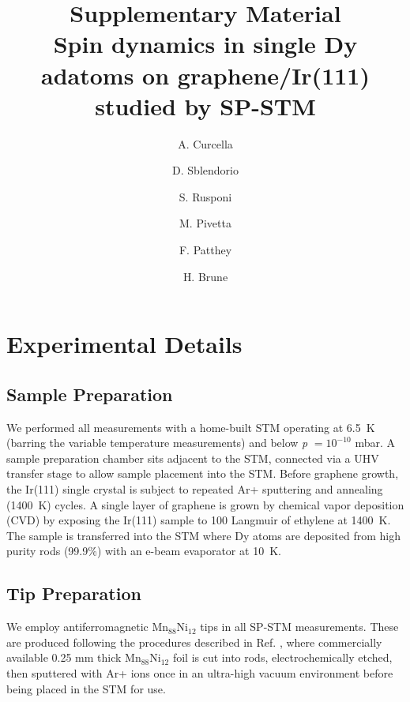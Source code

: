 \documentclass[reprint,amsmath,amssymb,aps,nofootinbib,onecolumn]{revtex4-2}
\begin{document}
\title{Supplementary Material\\Spin dynamics in single Dy adatoms on graphene/Ir(111)
studied by SP-STM}

\author{A. Curcella}

\author{D. Sblendorio}

\author{S. Rusponi}

\author{M. Pivetta}

\author{F. Patthey}

\author{H. Brune}

\maketitle
\section{Experimental Details}
\subsection{Sample Preparation}
We performed all measurements with a home-built STM \citep{Gaisch1992} operating at 6.5~K (barring the variable temperature measurements) and below \textit{p} $= 10^{-10}$ mbar. A sample preparation chamber sits adjacent to the STM, connected via a UHV transfer stage to allow sample placement into the STM. Before graphene growth, the Ir(111) single crystal is subject to repeated Ar+ sputtering and annealing (1400~K) cycles. A single layer of graphene is grown by chemical vapor deposition (CVD) by exposing the Ir(111) sample to 100 Langmuir of ethylene at 1400~K. The sample is transferred into the STM where Dy atoms are deposited from high purity rods (99.9\%) with an e-beam evaporator at 10~K.
\subsection{Tip Preparation}
We employ antiferromagnetic Mn$_{88}$Ni$_{12}$ tips in all SP-STM measurements. These are produced following the procedures described in Ref. \citep{Forrester2018}, where commercially available 0.25 mm thick Mn$_{88}$Ni$_{12}$ foil is cut into rods, electrochemically etched, then sputtered with Ar+ ions once in an ultra-high vacuum environment before being placed in the STM for use.
\end{document}
